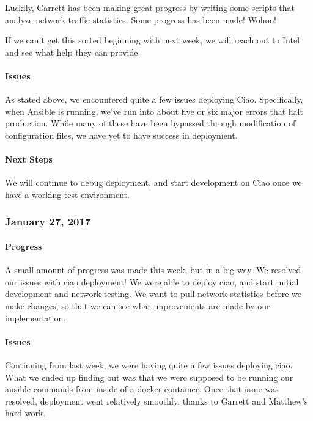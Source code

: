 \documentclass[10pt,onecolumn,journal,draftclsnofoot]{IEEEtran}
\begin{document}
Luckily, Garrett has been making great progress by writing some scripts
that analyze network traffic statistics. Some progress has been made!
Wohoo!

If we can't get this sorted beginning with next week, we will reach out
to Intel and see what help they can provide.

\paragraph{Issues} 

As stated above, we encountered quite a few issues deploying Ciao.
Specifically, when Ansible is running, we've run into about five or six
major errors that halt production. While many of these have been
bypassed through modification of configuration files, we have yet to
have success in deployment.

\paragraph{Next Steps} 

We will continue to debug deployment, and start development on Ciao once
we have a working test environment.

\subsubsection{January 27, 2017} 

\paragraph{Progress} 

A small amount of progress was made this week, but in a big way. We
resolved our issues with ciao deployment! We were able to deploy ciao,
and start initial development and network testing. We want to pull
network statistics before we make changes, so that we can see what
improvements are made by our implementation.

\paragraph{Issues} 

Continuing from last week, we were having quite a few issues deploying
ciao. What we ended up finding out was that we were supposed to be
running our ansible commands from inside of a docker container. Once
that issue was resolved, deployment went relatively smoothly, thanks to
Garrett and Matthew's hard work.
\end{document}
